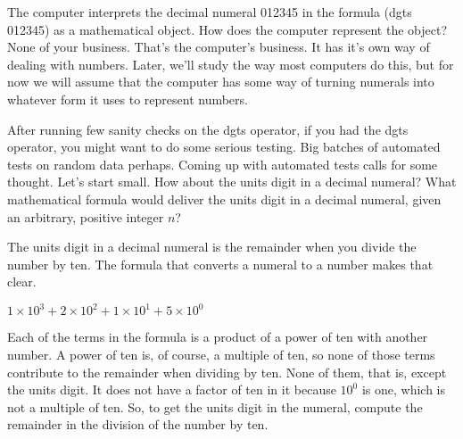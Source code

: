 The computer interprets the
decimal numeral 012345 in the formula \textsf{(dgts 012345)}
as a mathematical object.
How does the computer represent the object? None of your business.
That's the computer's business.
It has it's own way of dealing with numbers.
Later, we'll study the way most computers do this,
but for now we will assume that the computer has some way of turning
numerals into whatever form it uses to represent numbers.

After running few sanity checks on the \textsf{dgts} operator,
if you had the \textsf{dgts} operator, you might want to do some serious testing.
Big batches of automated tests on random data perhaps.
Coming up with automated tests calls for some thought.
Let's start small. How about the units digit in a decimal numeral?
What mathematical formula would deliver the units digit in a
decimal numeral, given an arbitrary, positive integer $n$?

The units digit in a decimal numeral is the remainder when you divide
the number by ten. The formula that converts a numeral to a number
makes that clear.
\begin{center}
$1 \times 10^3 + 2 \times 10^2 + 1 \times 10^1 + 5 \times 10^0$
\end{center}

Each of the terms in the formula is a product of a power
of ten with another number. A power of ten is, of course,
a multiple of ten, so none of those terms contribute to the remainder
when dividing by ten. None of them, that is, except the units digit.
It does not have a factor of ten in it because
$10^0$ is one, which is not a multiple of ten.
So, to get the units digit in the numeral,
compute the remainder in the division of the number by ten.


